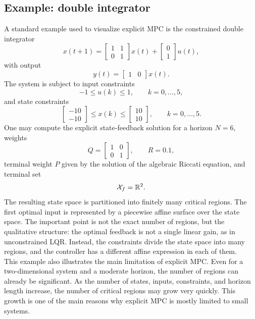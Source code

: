 \subsection{Example: double integrator}

A standard example used to visualize explicit MPC is the constrained double integrator
\[
    x(t+1)
    =
    \begin{bmatrix}
        1 & 1\\
        0 & 1
    \end{bmatrix}x(t)
    +
    \begin{bmatrix}
        0\\
        1
    \end{bmatrix}u(t),
\]
with output
\[
    y(t)=
    \begin{bmatrix}
        1 & 0
    \end{bmatrix}x(t).
\]
The system is subject to input constraints
\[
    -1\leq u(k)\leq 1,
    \qquad k=0,\ldots,5,
\]
and state constraints
\[
    \begin{bmatrix}
        -10\\
        -10
    \end{bmatrix}
    \leq
    x(k)
    \leq
    \begin{bmatrix}
        10\\
        10
    \end{bmatrix},
    \qquad k=0,\ldots,5.
\]
One may compute the explicit state-feedback solution for a horizon \(N=6\), weights
\[
    Q=
    \begin{bmatrix}
        1 & 0\\
        0 & 1
    \end{bmatrix},
    \qquad
    R=0.1,
\]
terminal weight \(P\) given by the solution of the algebraic Riccati equation, and terminal set
\[
    \mathcal{X}_f=\mathbb{R}^2.
\]
The resulting state space is partitioned into finitely many critical regions. The first optimal input is represented by a piecewise affine surface over the state space. The
important point is not the exact number of regions, but the qualitative structure: the optimal
feedback is not a single linear gain, as in unconstrained LQR. Instead, the constraints divide the
state space into many regions, and the controller has a different affine expression in each of
them.\\

This example also illustrates the main limitation of explicit MPC. Even for a two-dimensional
system and a moderate horizon, the number of regions can already be significant. As the number
of states, inputs, constraints, and horizon length increase, the number of critical regions may
grow very quickly. This growth is one of the main reasons why explicit MPC is mostly limited
to small systems.

